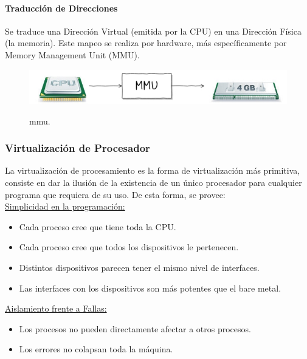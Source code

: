 \documentclass[../main.tex]{subfiles}
\begin{document}
        \paragraph*{Traducción de Direcciones}
            Se traduce una Dirección Virtual (emitida por la CPU) en una Dirección Física (la memoria). Este mapeo se realiza por hardware, más específicamente por Memory Management Unit (MMU).

            \begin{figure}[ht]
                \centering
                \includegraphics[scale=0.4]{../images/mmu.jpg}
                \label{fig:direccion}
                \caption{mmu.}
            \end{figure}

    \subsubsection*{Virtualización de Procesador}
        La virtualización de procesamiento es la forma de virtualización más primitiva, consiste en dar la ilusión de la existencia de un único procesador para cualquier programa que requiera de su uso. De esta forma, se provee:\\

        \underline{Simplicidad en la programación:}
        \begin{itemize}
            \item Cada proceso cree que tiene toda la CPU.
            \item Cada proceso cree que todos los dispositivos le pertenecen.
            \item Distintos dispositivos parecen tener el mismo nivel de interfaces.
            \item Las interfaces con los dispositivos son más potentes que el bare metal.
        \end{itemize}

        \underline{Aislamiento frente a Fallas:}
        \begin{itemize}
            \item Los procesos no pueden directamente afectar a otros procesos.
            \item Los errores no colapsan toda la máquina.
        \end{itemize}
\end{document}
